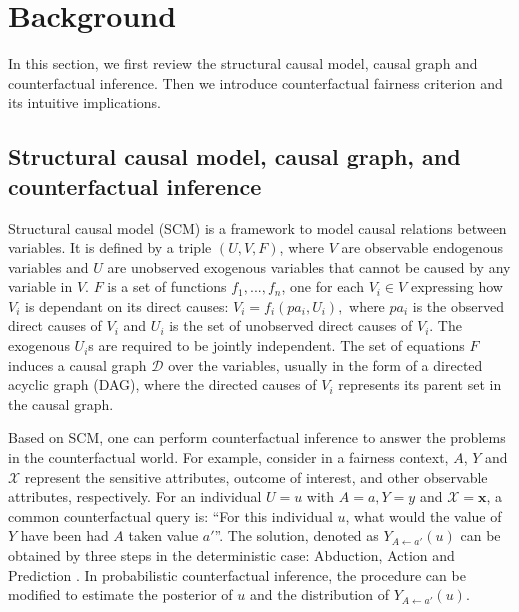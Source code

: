 \documentclass{article}
\begin{document}
\section{Background} \label{sec: Preliminary}
In this section, we first review the structural causal model, causal graph and counterfactual inference. Then we introduce counterfactual fairness criterion and its intuitive implications.

\subsection{Structural causal model, causal graph, and counterfactual inference} \label{sec: SCM and CF}
Structural causal model (SCM) \citep{pearl2000models} is a framework to model causal relations between variables. It is defined by a triple $(U,V,F)$, where $V$ are observable endogenous variables and $U$ are unobserved exogenous variables that cannot be caused by any variable in $V$. $F$ is a set of functions ${f_1,...,f_n}$, one for each $V_i \in V$ expressing how $V_i$ is dependant on its direct causes:
$
V_i = f_i(pa_i, U_i),
$ 
where $pa_i$ is the observed direct causes of $V_i$ and $U_i$ is the set of unobserved direct causes of $V_i$. The exogenous $U_i$s are required to be jointly independent. The set of equations $F$ induces a causal graph $\mathcal{D}$ over the variables, usually in the form of a directed acyclic graph (DAG), where the directed causes of $V_i$ represents its parent set in the causal graph.

Based on SCM, one can perform counterfactual inference to answer the problems in the counterfactual world. For example, consider in a fairness context, $A$, $Y$ and $\mathcal{X}$ represent the sensitive attributes, outcome of interest, and other observable attributes, respectively. For an individual $U=u$ with $A=a, Y=y$ and $\mathcal{X}=\mathbf{x}$, a common counterfactual query is: “For this individual $u$, what would the value of $Y$ have been had $A$ taken value $a'$”. The solution, denoted as $Y_{A \leftarrow a'}(u)$ can be obtained by three steps in the deterministic case: Abduction, Action and Prediction \cite[Chapter 7.1]{pearl2000models}.
In probabilistic counterfactual inference, the procedure can be modified to estimate the posterior of $u$ and the distribution of $Y_{A \leftarrow a'}(u)$. 
\end{document}
